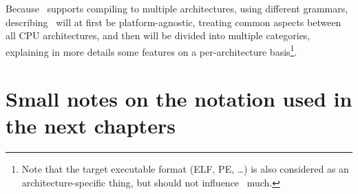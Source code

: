 \vspace{\baselineskip}

Because \nstar\ supports compiling to multiple architectures, using different grammars, describing \nstar\ will at first be platform-agnostic, treating common aspects between all CPU architectures, and then will be divided into multiple categories, explaining in more details some features on a per-architecture basis\footnote{Note that the target executable format (ELF, PE, \ldots) is also considered as an architecture-specific thing, but should not influence \nstar\ much.}.

\section*{Small notes on the notation used in the next chapters}\label{sec:nstar-abstract-notation}

